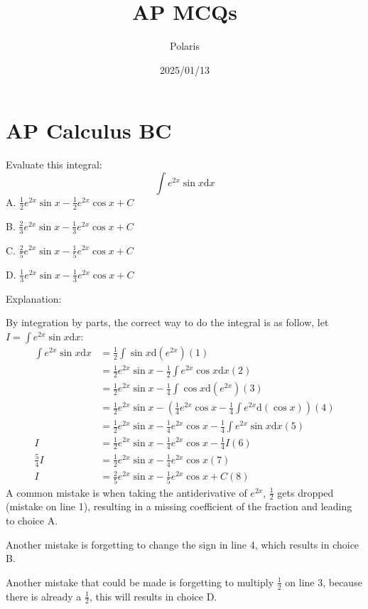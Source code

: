 \documentclass{article}
\title{AP MCQs}
\author{Polaris}
\date{2025/01/13}
\numberwithin{equation}{section}
\begin{document}
\maketitle

\section{AP Calculus BC}
Evaluate this integral:
\[
    \int e^{2x} \sin x \mathrm{d}x
\]
A. $ \frac{1}{2} e^{2x} \sin x - \frac{1}{2}e^{2x} \cos x + C$

B. $\frac{2}{3}e^{2x}\sin x - \frac{1}{3} e^{2x} \cos x + C$

C. $\frac{2}{5} e^{2x} \sin x - \frac{1}{5} e^{2x} \cos x + C$

D. $\frac{1}{3} e^{2x} \sin x - \frac{1}{3} e^{2x} \cos x +C$

Explanation:

By integration by parts, the correct way to do the integral is as follow, let $I = \int e^{2x} \sin x \mathrm{d}x$:
\[
    \begin{split}
        \int e^{2x} \sin x \mathrm{d}x & = \frac{1}{2}\int \sin x \mathrm{d}(e^{2x})  (1)\\
        & = \frac{1}{2} e^{2x} \sin x - \frac{1}{2} \int e^{2x} \cos x \mathrm{d}x  (2)\\
        & = \frac{1}{2} e^{2x} \sin x - \frac{1}{4} \int \cos x \mathrm{d}(e^{2x})  (3)\\
        & = \frac{1}{2} e^{2x} \sin x - (\frac{1}{4} e^{2x} \cos x -\frac{1}{4}\int e^{2x} \mathrm{d}(\cos x))  (4)\\
        & = \frac{1}{2} e^{2x} \sin x - \frac{1}{4} e^{2x} \cos x -\frac{1}{4}\int e^{2x} \sin x \mathrm{d}x(5)\\
        I & = \frac{1}{2} e^{2x} \sin x - \frac{1}{4} e^{2x} \cos x -\frac{1}{4}I  (6)\\
        \frac{5}{4} I & = \frac{1}{2} e^{2x} \sin x - \frac{1}{4} e^{2x} \cos x  (7)\\
        I & =  \frac{2}{5} e^{2x} \sin x - \frac{1}{5} e^{2x} \cos x + C  (8)
    \end{split}
\]
A common mistake is when taking the antiderivative of $e^{2x}$, $\frac{1}{2}$ gets dropped (mistake on line 1), 
resulting in a missing coefficient of the fraction and leading to choice A.

Another mistake is forgetting to change the sign in line 4, which results in choice B.

Another mistake that could be made is forgetting to multiply $\frac{1}{2}$ on line 3, because there is already a $\frac{1}{2}$, this will results in choice D.
\end{document}
